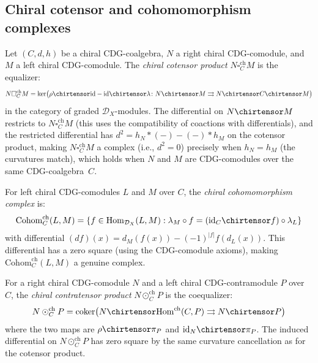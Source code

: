 \subsection{Chiral cotensor and cohomomorphism complexes}
\label{subsec:chiral-cotensor}

\begin{definition}\label{def:chiral-cotensor}
Let $(C, d, h)$ be a chiral CDG-coalgebra, $N$ a right chiral
CDG-comodule, and $M$ a left chiral CDG-comodule. The
\emph{chiral cotensor product} $N \square_C^{\mathrm{ch}} M$ is
the equalizer:
\[
N \square_C^{\mathrm{ch}} M =
\ker\bigl(\rho \chirtensor \mathrm{id} - \mathrm{id} \chirtensor \lambda\colon
N \chirtensor M \rightrightarrows N \chirtensor C \chirtensor M\bigr)
\]
in the category of graded $\mathcal{D}_X$-modules.
The differential on $N \chirtensor M$ restricts to
$N \square_C^{\mathrm{ch}} M$ (this uses the compatibility of coactions
with differentials), and the restricted differential has
$d^2 = h_N \ast (-) - (-) \ast h_M$ on the cotensor product, making
$N \square_C^{\mathrm{ch}} M$ a complex (i.e., $d^2 = 0$) precisely
when $h_N = h_M$ (the curvatures match), which holds when $N$ and $M$
are CDG-comodules over the same CDG-coalgebra~$C$.
\end{definition}

\begin{definition}\label{def:chiral-cohom}
For left chiral CDG-comodules $L$ and $M$ over $C$, the
\emph{chiral cohomomorphism complex} is:
\[
\mathrm{Cohom}_C^{\mathrm{ch}}(L, M) =
\{f \in \mathrm{Hom}_{\mathcal{D}_X}(L, M) :
\lambda_M \circ f = (\mathrm{id}_C \chirtensor f) \circ \lambda_L\}
\]
with differential $(d f)(x) = d_M(f(x)) - (-1)^{|f|} f(d_L(x))$.
This differential has a zero square (using the CDG-comodule axioms),
making $\mathrm{Cohom}_C^{\mathrm{ch}}(L, M)$ a genuine complex.
\end{definition}

\begin{definition}\label{def:chiral-contratensor}
For a right chiral CDG-comodule $N$ and a left chiral
CDG-contramodule $P$ over $C$, the \emph{chiral contratensor
product} $N \odot_C^{\mathrm{ch}} P$ is the coequalizer:
\[
N \odot_C^{\mathrm{ch}} P =
\mathrm{coker}\bigl(
N \chirtensor \mathrm{Hom}^{\mathrm{ch}}(C, P) \rightrightarrows N \chirtensor P
\bigr)
\]
where the two maps are
$\rho \chirtensor \pi_P$ and $\mathrm{id}_N \chirtensor \pi_P$.
The induced differential on $N \odot_C^{\mathrm{ch}} P$ has zero
square by the same curvature cancellation as for the cotensor product.
\end{definition}


